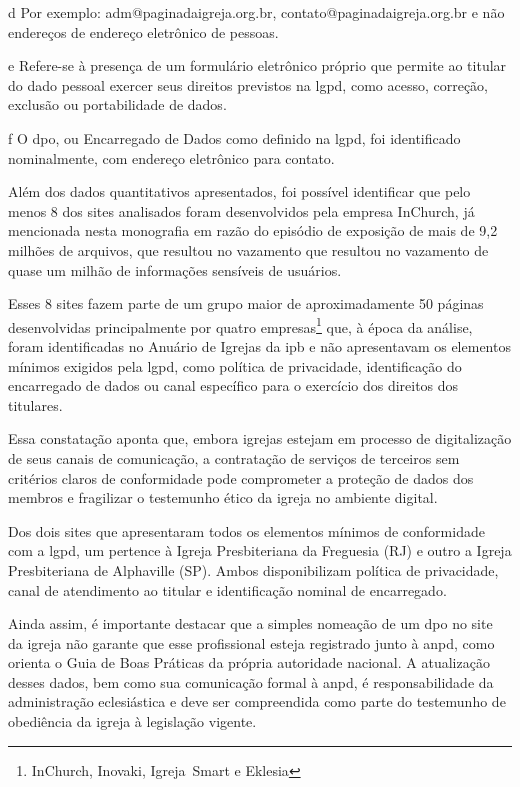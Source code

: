 \begin{table}[H]
\begin{threeparttable}
\begin{tablenotes}
\item[d] Por exemplo: adm@paginadaigreja.org.br, contato@paginadaigreja.org.br e não endereços de endereço eletrônico de pessoas.
\item[e] Refere-se à presença de um formulário eletrônico próprio que permite ao titular do dado pessoal exercer seus direitos previstos na \gls{lgpd}, como acesso, correção, exclusão ou portabilidade de dados.
\item[f] O \gls{dpo}, ou Encarregado de Dados como definido na \gls{lgpd}, foi identificado nominalmente, com endereço eletrônico para contato.
\end{tablenotes}
\end{threeparttable}
\end{table}

Além dos dados quantitativos apresentados, foi possível identificar que pelo menos 8 dos sites analisados foram desenvolvidos pela empresa \mbox{InChurch}, já mencionada nesta monografia em razão do episódio de exposição de mais de 9,2 milhões de arquivos, que resultou no vazamento que resultou no vazamento de quase um milhão de informações sensíveis de usuários\cite{almeida_inchurch_2024}.

Esses 8 sites fazem parte de um grupo maior de aproximadamente 50 páginas desenvolvidas principalmente por quatro empresas\footnote{\mbox{InChurch}, \mbox{Inovaki}, \mbox{Igreja Smart} e \mbox{Eklesia}} que, à época da análise, foram identificadas no Anuário de Igrejas da \gls{ipb} e não apresentavam os elementos mínimos exigidos pela \gls{lgpd}, como política de privacidade, identificação do encarregado de dados ou canal específico para o exercício dos direitos dos titulares.

Essa constatação aponta que, embora igrejas estejam em processo de digitalização de seus canais de comunicação, a contratação de serviços de terceiros sem critérios claros de conformidade pode comprometer a proteção de dados dos membros e fragilizar o testemunho ético da igreja no ambiente digital.

Dos dois sites que apresentaram todos os elementos mínimos de conformidade com a \gls{lgpd}, um pertence à Igreja Presbiteriana da Freguesia (RJ) e outro a Igreja Presbiteriana de Alphaville (SP). Ambos disponibilizam política de privacidade, canal de atendimento ao titular e identificação nominal de encarregado.

Ainda assim, é importante destacar que a simples nomeação de um \gls{dpo} no site da igreja não garante que esse profissional esteja registrado junto à \gls{anpd}, como orienta o Guia de Boas Práticas da própria autoridade nacional. A atualização desses dados, bem como sua comunicação formal à \gls{anpd}, é responsabilidade da administração eclesiástica e deve ser compreendida como parte do testemunho de obediência da igreja à legislação vigente.

